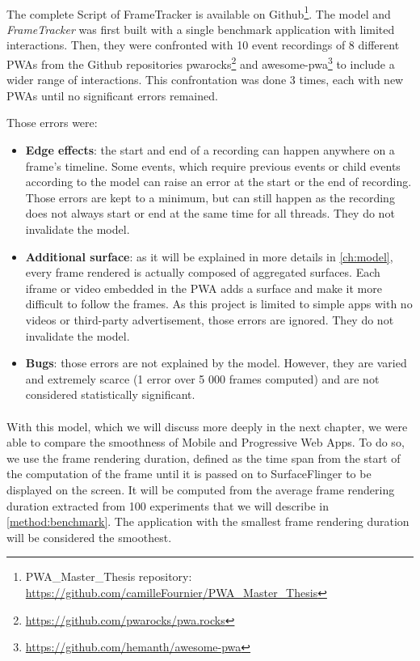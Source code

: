 \documentclass{kththesis}
\begin{document}
    
    
    \paragraph{}
    The complete Script of FrameTracker is available on Github\footnote{PWA\_Master\_Thesis repository: \url{https://github.com/camilleFournier/PWA_Master_Thesis}}.
    The model and \textit{FrameTracker} was first built with a single benchmark application with limited interactions. Then, they were confronted with 10 event recordings of 8 different PWAs from the Github repositories pwarocks\footnote{\url{https://github.com/pwarocks/pwa.rocks}} and awesome-pwa\footnote{\url{https://github.com/hemanth/awesome-pwa}} to include a wider range of interactions. This confrontation was done 3 times, each with new PWAs until no significant errors remained.
    
    Those errors were:
    \begin{itemize}
        \item \textbf{Edge effects}: the start and end of a recording can happen anywhere on a frame's timeline. Some events, which require previous events or child events according to the model can raise an error at the start or the end of recording. Those errors are kept to a minimum, but can still happen as the recording does not always start or end at the same time for all threads. They do not invalidate the model.
        \item \textbf{Additional surface}: as it will be explained in more details in \autoref{ch:model}, every frame rendered is actually composed of aggregated surfaces. Each iframe or video embedded in the PWA adds a surface and make it more difficult to follow the frames. As this project is limited to simple apps with no videos or third-party advertisement, those errors are ignored. They do not invalidate the model.
        \item \textbf{Bugs}: those errors are not explained by the model. However, they are varied and extremely scarce (1 error over 5 000 frames computed) and are not considered statistically significant.
    \end{itemize}
    \paragraph{}
    With this model, which we will discuss more deeply in the next chapter, we were able to compare the smoothness of Mobile and Progressive Web Apps. To do so, we use the frame rendering duration, defined as the time span from the start of the computation of the frame until it is passed on to SurfaceFlinger to be displayed on the screen. It will be computed from the average frame rendering duration extracted from 100 experiments that we will describe in \autoref{method:benchmark}. The application with the smallest frame rendering duration will be considered the smoothest.
    
\end{document}
